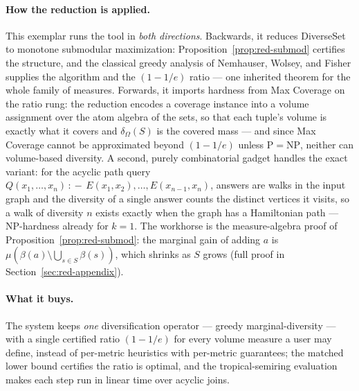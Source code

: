 \paragraph{How the reduction is applied.}
This exemplar runs the tool in \emph{both directions}. Backwards, it reduces
DiverseSet to monotone submodular maximization: Proposition~\ref{prop:red-submod}
certifies the structure, and the classical greedy analysis of Nemhauser, Wolsey, and
Fisher supplies the algorithm and the $(1 - 1/e)$ ratio --- one inherited theorem for
the whole family of measures. Forwards, it imports hardness from Max Coverage on the
ratio rung: the reduction encodes a coverage instance into a volume assignment over
the atom algebra of the sets, so that each tuple's volume is exactly what it covers
and $\delta_\Omega(S)$ is the covered mass --- and since Max Coverage cannot be
approximated beyond $(1 - 1/e)$ unless $\mathrm{P} = \mathrm{NP}$, neither can
volume-based diversity. A second, purely combinatorial gadget handles the exact
variant: for the acyclic path query $Q(x_1,\dots,x_n) \,{:\!-}\, E(x_1,x_2), \dots,
E(x_{n-1},x_n)$, answers are walks in the input graph and the diversity of a single
answer counts the distinct vertices it visits, so a walk of diversity $n$ exists
exactly when the graph has a Hamiltonian path --- NP-hardness already for $k = 1$. The
workhorse is the measure-algebra proof of Proposition~\ref{prop:red-submod}: the
marginal gain of adding $a$ is $\mu(\beta(a) \setminus \bigcup_{s \in S}\beta(s))$,
which shrinks as $S$ grows (full proof in Section~\ref{sec:red-appendix}).


\paragraph{What it buys.}
The system keeps \emph{one} diversification operator --- greedy marginal-diversity ---
with a single certified ratio $(1 - 1/e)$ for every volume measure a user may define,
instead of per-metric heuristics with per-metric guarantees; the matched lower bound
certifies the ratio is optimal, and the tropical-semiring evaluation makes each step
run in linear time over acyclic joins.

